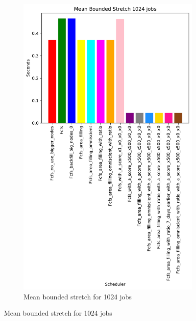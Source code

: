 \documentclass[a4paper]{article}
\begin{document}
\begin{figure}[H]
\begin{subfigure}[b]{0.4\linewidth}\centering\includegraphics[width=0.7\linewidth]{MBSS/plot/Results_Size_And_Data_2022-01-17->2022-01-17_V9532_Mean_Stretch_With_a_Minimum_1024_450_128_32_256_4_1024.pdf}\caption{Mean bounded stretch for 1024 jobs}\label{45}\end{subfigure}

\end{figure}
\end{document}

